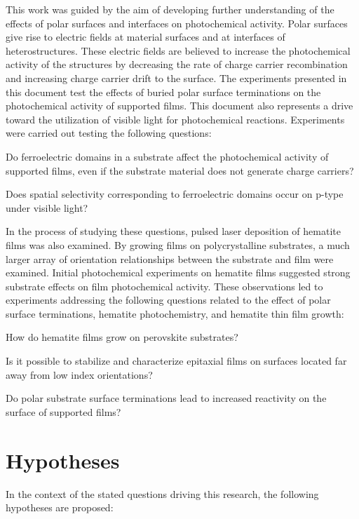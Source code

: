 This work was guided by the aim of developing further understanding of the effects of
polar surfaces and interfaces on photochemical activity. Polar surfaces give rise to
electric fields at material surfaces and at interfaces of heterostructures. These electric
fields are believed to increase the photochemical activity of the structures by decreasing
the rate of charge carrier recombination and increasing charge carrier drift to the
surface. The experiments presented in this document test the effects of buried polar
surface terminations on the photochemical activity of supported films. This document also
represents a drive toward the utilization of visible light for photochemical reactions.
Experiments were carried out testing the following questions:

\begin{items}

	\item Do ferroelectric domains in a substrate affect the photochemical activity of
supported films, even if the substrate material does not generate charge carriers?
	\item Does spatial selectivity corresponding to ferroelectric domains occur on p-type
 under visible light?
\end{items}

In the process of studying these questions, pulsed laser deposition of hematite 
films was also examined. By growing films on polycrystalline substrates, a much larger
array of orientation relationships between the substrate and film were examined. Initial
photochemical experiments on hematite films suggested strong substrate effects on film
photochemical activity. These observations led to experiments addressing the following
questions related to the effect of polar surface terminations, hematite photochemistry,
and hematite thin film growth:

\begin{items}
	\item How do hematite films grow on perovskite substrates?
	\item Is it possible to stabilize and characterize epitaxial films on surfaces located
far away from low index orientations?
	\item Do polar substrate surface terminations lead to increased reactivity on the
surface of supported films?
\end{items}

\section{Hypotheses}\label{sec:intro.hypotheses}
In the context of the stated questions driving this research, the following hypotheses are
proposed:

